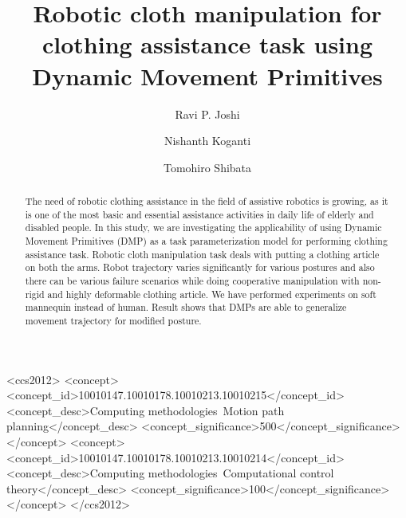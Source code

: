 \documentclass[sigconf]{acmart}
\begin{document}
\title{Robotic cloth manipulation for clothing assistance task using Dynamic Movement
Primitives}




\author{Ravi P. Joshi}
\affiliation{}

\author{Nishanth Koganti}
\affiliation{}

\author{Tomohiro Shibata}
\affiliation{}

\graphicspath{{./images/}}

\begin{abstract}
	The need of robotic clothing assistance in the field of assistive robotics is growing, as it is one of the most basic and essential assistance activities in daily life of elderly and disabled people. In this study, we are investigating the applicability of using Dynamic Movement Primitives (DMP) as a task parameterization model for performing clothing assistance task. Robotic cloth manipulation task deals with putting a clothing article on both the arms. Robot trajectory varies significantly for various postures and also there can be various failure scenarios while doing cooperative manipulation with non-rigid and highly deformable clothing article. We have performed experiments on soft mannequin instead of human. Result shows that DMPs are able to generalize movement trajectory for modified posture.
\end{abstract}

\begin{CCSXML}
	<ccs2012>
	<concept>
	<concept_id>10010147.10010178.10010213.10010215</concept_id>
	<concept_desc>Computing methodologies~Motion path planning</concept_desc>
	<concept_significance>500</concept_significance>
	</concept>
	<concept>
	<concept_id>10010147.10010178.10010213.10010214</concept_id>
	<concept_desc>Computing methodologies~Computational control theory</concept_desc>
	<concept_significance>100</concept_significance>
	</concept>
	</ccs2012>
\end{CCSXML}
\end{document}
